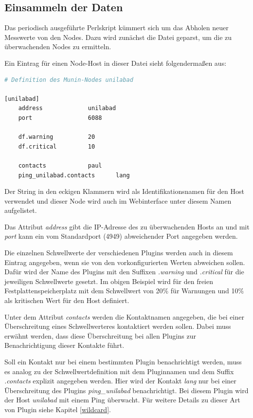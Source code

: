\subsection{Einsammeln der Daten}
Das periodisch ausgeführte Perlskript  kümmert sich um das Abholen neuer Messwerte von den Nodes.
Dazu wird zunächst die Datei  geparst, um die zu überwachenden Nodes zu ermitteln.

Ein Eintrag für einen Node-Host in dieser Datei sieht folgendermaßen aus:


\begin{lstlisting}[captionpos=b, caption=Beispielhafte Definition eines Munin-Nodes, label=nodedef, breaklines = true, language=bash]
# Definition des Munin-Nodes unilabad

[unilabad]
	address 			unilabad
	port				6088
	
	df.warning			20
	df.critical			10
	
	contacts			paul
	ping_unilabad.contacts		lang
\end{lstlisting}

Der String in den eckigen Klammern wird als Identifikationsnamen für den Host verwendet und dieser Node wird auch im Webinterface unter diesem Namen aufgelistet.

Das Attribut \textit{address} gibt die IP-Adresse des zu überwachenden Hosts an und mit \textit{port} kann ein vom Standardport (4949) abweichender Port angegeben werden.

Die einzelnen Schwellwerte der verschiedenen Plugins werden auch in diesem Eintrag angegeben, wenn sie von den vorkonfigurierten Werten abweichen sollen.
Dafür wird der Name des Plugins mit den Suffixen \textit{.warning} und \textit{.critical} für die jeweiligen Schwellwerte gesetzt.
Im obigen Beispiel wird  für den freien Festplattenspeicherplatz mit dem Schwellwert von 20\% für Warnungen und 10\% als kritischen Wert für den Host definiert.

Unter dem Attribut \textit{contacts} werden die Kontaktnamen angegeben, die bei einer Überschreitung eines Schwellwerteres kontaktiert werden sollen.
Dabei muss erwähnt werden, dass diese Überschreitung bei allen Plugins zur Benachrichtigung dieser Kontakte führt.

Soll ein Kontakt nur bei einem bestimmten Plugin benachrichtigt werden, muss es analog zu der Schwellwertdefinition mit dem Pluginnamen und dem Suffix \textit{.contacts} explizit angegeben werden. Hier wird der Kontakt \textit{lang} nur bei einer Überschreitung des Plugins \textit{ping\_unilabad} benachrichtigt.
Bei diesem Plugin wird der Host \textit{unilabad} mit einem Ping überwacht.
Für weitere Details zu dieser Art von Plugin siehe Kapitel \ref{wildcard}.

